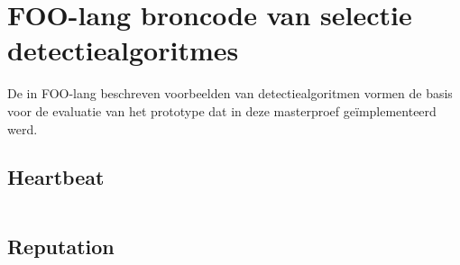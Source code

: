 
\chapter{FOO-lang broncode van selectie detectiealgoritmes}
\label{appendix:demo-code}

De in FOO-lang beschreven voorbeelden van detectiealgoritmen vormen de basis
voor de evaluatie van het prototype dat in deze masterproef ge\"implementeerd
werd.

\section{Heartbeat}
\label{section:demo-code-heartbeat}

\inputminted[linenos,frame=lines,framesep=2mm,fontsize=\footnotesize]{js}{../src/foo-lang/examples/heartbeat.foo}
\vspace{-5mm}

\section{Reputation}
\label{section:demo-code-reputation}

\inputminted[linenos,frame=lines,framesep=2mm,fontsize=\footnotesize]{js}{../src/foo-lang/examples/reputation.foo}
\vspace{-5mm}
